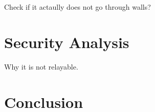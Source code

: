 \documentclass[sigconf,authordraft]{acmart}
\begin{document}
Check if it actaully does not go through walls?

\section{Security Analysis}
Why it is not relayable.

\section{Conclusion}







\end{document}
